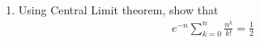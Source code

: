 \renewcommand{\theequation}{\theenumi}
\renewcommand{\thefigure}{\theenumi}
\renewcommand{\thetable}{\theenumi}
\begin{enumerate}[label=\thesection.\arabic*.,ref=\thesection.\theenumi]

\item Using Central Limit theorem, show that
\begin{align}
   e^{-n} \sum_{k=0}^{n} \frac{n^k}{k!}   = \frac{1}{2}
\end{align}
\solution


\end{enumerate}